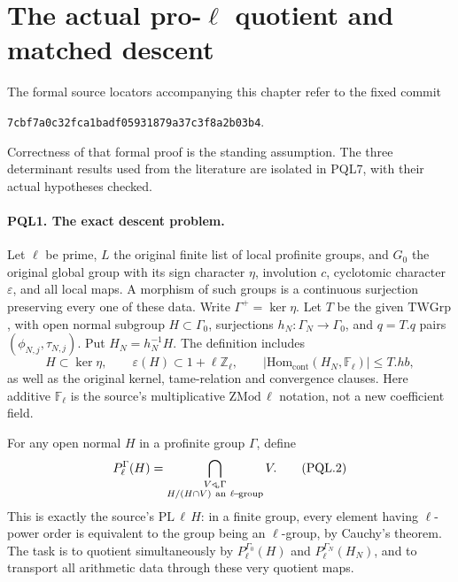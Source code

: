 \section{The actual pro-\texorpdfstring{$\ell$}{ell} quotient and matched descent}
\label{sec:proell-descent-v039}


The formal source locators accompanying this chapter refer to the
fixed commit
\par\smallskip\noindent
\texttt{7cbf7a0c32fca1badf05931879a37c3f8a2b03b4}.\par\smallskip
Correctness of that formal proof is the standing assumption.
The three determinant results used from the literature are isolated
in PQL7, with their actual hypotheses checked.

\paragraph{PQL1. The exact descent problem.}\label{claim:PQL1}
Let \(\ell\) be prime, \(L\) the original finite list of local
profinite groups, and \(G_0\) the original global group with its
sign character \(\eta\), involution \(c\), cyclotomic character
\(\varepsilon\), and all local maps. A morphism of such groups
is a continuous surjection preserving every one of these data.
Write \(\Gamma^+=\ker\eta\). Let \(T\) be the given
\(\mathrm{TWGrp}\), with open normal subgroup \(H\subset\Gamma_0\),
surjections \(h_N:\Gamma_N\to\Gamma_0\), and \(q=T.q\) pairs
\((\phi_{N,j},\tau_{N,j})\). Put \(H_N=h_N^{-1}H\).
The definition includes
\[
 H\subset\ker\eta,\qquad \varepsilon(H)\subset1+\ell\mathbb Z_\ell,
 \qquad |\mathrm{Hom}_{\mathrm{cont}}(H_N,\mathbb F_\ell)|
       \leq T.hb,                                      \tag{PQL.1}
\]
as well as the original kernel, tame-relation and convergence clauses.
Here additive \(\mathbb F_\ell\) is the source's multiplicative
\(\mathrm{ZMod}\,\ell\) notation, not a new coefficient field.

For any open normal \(H\) in a profinite group \(\Gamma\), define
\[
 P_\ell^\Gamma(H)=
 \bigcap_{\substack{V\triangleleft_{\!o}\Gamma\\
              H/(H\cap V)\ {\rm an}\ \ell{\rm\!-\!group}}}V.
                                                            \tag{PQL.2}
\]
This is exactly the source's \(\mathrm{PL}\,\ell\,H\):
in a finite group, every element having \(\ell\)-power order is
equivalent to the group being an \(\ell\)-group, by Cauchy's theorem.
The task is to quotient simultaneously by \(P_\ell^{\Gamma_0}(H)\)
and \(P_\ell^{\Gamma_N}(H_N)\), and to transport all arithmetic
data through these very quotient maps.

